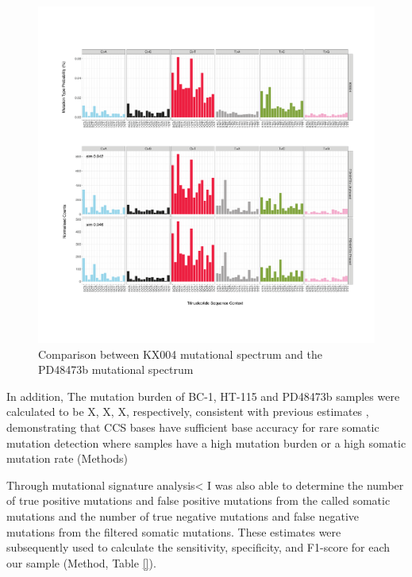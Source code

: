 \begin{figure}[htbp!]
\caption{Comparison between KX004 mutational spectrum and the PD48473b mutational spectrum}
\label{figure:PD48473b}
\includegraphics[width=\textwidth]{Vector/hg19.KX001.PD48473b.pdf}
\end{figure}

In addition, The mutation burden of BC-1, HT-115 and PD48473b samples were calculated to be X, X, X, respectively, consistent with previous estimates \cite{Mitchell2022-ry, Petljak2019-wi}, demonstrating that CCS bases have sufficient base accuracy for rare somatic mutation detection where samples have a high mutation burden or a high somatic mutation rate (Methods) 

Through mutational signature analysis< I was also able to determine the number of true positive mutations and false positive mutations from the called somatic mutations and the number of true negative mutations and false negative mutations from the filtered somatic mutations. These estimates were subsequently used to calculate the sensitivity, specificity, and F1-score for each our sample (Method, Table \ref{}).

